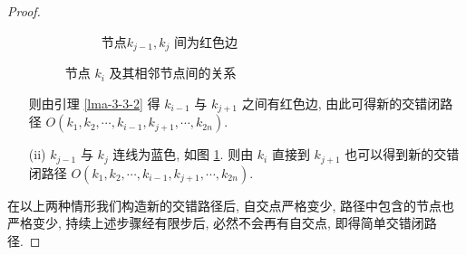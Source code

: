 \begin{proof}
\begin{itemize}
\begin{figure}[htbp]
\begin{subfigure}[b]{0.3\textwidth}
    \caption{ 节点$k_{j-1},k_j$ 间为红色边}
    \label{fig:cross-graph-2-b}
    \end{subfigure}
    \caption{节点 $k_i$ 及其相邻节点间的关系}
    \label{fig:cross-graph-2}
\end{figure}
则由引理 \ref{lma-3-3-2} 得 $k_{i-1}$ 与 $k_{j+1}$ 之间有红色边, 由此可得新的交错闭路径 $O(k_1,k_2,\cdots,k_{i-1} ,k_{j+1},\cdots,k_{2n})$.
\item [(ii)] $k_{j-1}$ 与 $k_j$ 连线为蓝色, 如图 \ref{fig:cross-graph-2-b}. 则由 $k_{i}$ 直接到 $k_{j+1}$ 也可以得到新的交错闭路径 $O(k_1,k_2,\cdots, k_{i-1},k_{j+1},\cdots ,k_{2n})$. 
\end{itemize}
在以上两种情形我们构造新的交错路径后, 自交点严格变少, 路径中包含的节点也严格变少, 持续上述步骤经有限步后, 必然不会再有自交点, 即得简单交错闭路径.
\end{proof}


